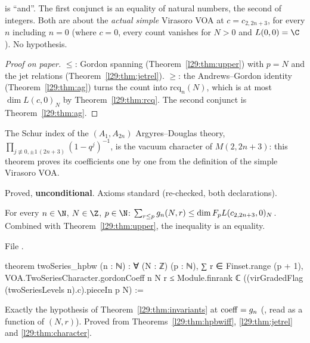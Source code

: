 \begin{dictionary}
 is ``and''. The first conjunct is an equality of natural numbers, the second of integers. Both are about the
\emph{actual simple} Virasoro VOA at $c=c_{2,2n+3}$, for every $n$ including $n=0$ (where $c=0$, every count vanishes
for $N>0$ and $L(0,0)=\C$). No hypothesis.
\end{dictionary}

\begin{proof}[Proof on paper]
$\le$: Gordon spanning (Theorem~\ref{l29:thm:upper}) with $p=N$ and the jet relations (Theorem~\ref{l29:thm:jetrel}).
$\ge$: the Andrews--Gordon identity (Theorem~\ref{l29:thm:ag}) turns the count into $\mathrm{rcq}_n(N)$, which is at
most $\dim L(c,0)_N$ by Theorem~\ref{l29:thm:rcq}. The second conjunct is Theorem~\ref{l29:thm:ag}.
\end{proof}

\begin{physics}
The Schur index of the $(A_1,A_{2n})$ Argyres--Douglas theory, $\prod_{j\not\equiv0,\pm1\,(2n+3)}(1-q^j)^{-1}$, is the
vacuum character of $M(2,2n+3)$: this theorem proves its coefficients one by one from the definition of the simple
Virasoro VOA.
\end{physics}

\begin{status}
Proved, \textbf{unconditional}. Axioms standard (re-checked, both declarations).
\end{status}

\begin{theorem}\label{l29:thm:hpbw}
For every $n\in\N$, $N\in\Z$, $p\in\N$: $\sum_{r\le p}g_n(N,r)\le\dim F_pL(c_{2,2n+3},0)_N$. Combined with
Theorem~\ref{l29:thm:upper}, the inequality is an equality.
\end{theorem}

\noindent File .
\begin{leancode}
theorem twoSeries_hpbw (n : ℕ) :
    ∀ (N : ℤ) (p : ℕ), ∑ r ∈ Finset.range (p + 1), VOA.TwoSeriesCharacter.gordonCoeff n N r ≤
      Module.finrank ℂ ((virGradedFlag (twoSeriesLevels n).c).pieceIn p N) :=
\end{leancode}

\begin{dictionary}
Exactly the hypothesis  of Theorem~\ref{l29:thm:invariants} at $\mathrm{coeff}=g_n$
(, read as a function of $(N,r)$). Proved from Theorems~\ref{l29:thm:hpbwiff},
\ref{l29:thm:jetrel} and \ref{l29:thm:character}.
\end{dictionary}


